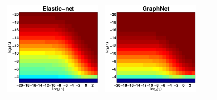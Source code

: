 \begin{figure}[t]
\begin{tabular}{cccc}
	\includegraphics[width=\imwidth,height=\imheight]{exp_gridsearch_nnz_log10_enet.pdf} &
	\includegraphics[width=\imwidth,height=\imheight]{exp_gridsearch_nnz_log10_gnet.pdf} &

\end{tabular}
\end{figure}
